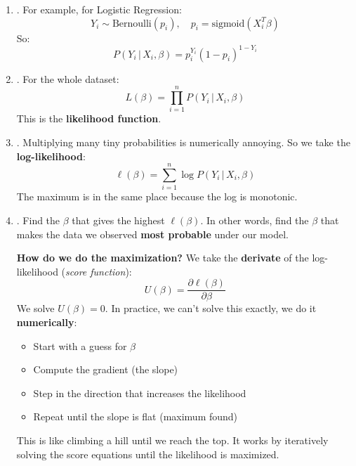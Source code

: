 \begin{enumerate}
    \item {}. For example, for Logistic Regression:
    \begin{equation*}
        Y_i \sim \text{Bernoulli}(p_i), \quad p_i = \text{sigmoid}(X_i^T \beta)
    \end{equation*}
    So:
    \begin{equation*}
        P(Y_i \, | \, X_i, \beta) = p_i^{Y_i} (1 - p_i)^{1 - Y_i}
    \end{equation*}

    \item {}. For the whole dataset:
    \begin{equation*}
        L(\beta) = \prod_{i=1}^n P(Y_i \, | \, X_i, \beta)
    \end{equation*}
    This is the \textbf{likelihood function}.

    \item {}. Multiplying many tiny probabilities is numerically annoying. So we take the \textbf{log-likelihood}:
    \begin{equation*}
        \ell(\beta) = \sum_{i=1}^n \log P(Y_i \, | \, X_i, \beta)
    \end{equation*}
    The maximum is in the same place because the log is monotonic.

    \item {}. Find the $\beta$ that gives the highest $\ell(\beta)$. In other words, find the $\beta$ that makes the data we observed \textbf{most probable} under our model.

    \textcolor{Green3}{ \textbf{How do we do the maximization?}} We take the \textbf{derivate} of the log-likelihood (\emph{score function}):
    \begin{equation}
        U(\beta) = \frac{\partial \ell(\beta)}{\partial \beta}
    \end{equation}
    We solve $U\left(\beta\right) = 0$. In practice, we can't solve this exactly, we do it \textbf{numerically}:
    \begin{itemize}
        \item Start with a guess for $\beta$
        \item Compute the gradient (the slope)
        \item Step in the direction that increases the likelihood
        \item Repeat until the slope is flat (maximum found)
    \end{itemize}
    This is like climbing a hill until we reach the top. It works by iteratively solving the score equations until the likelihood is maximized.
\end{enumerate}

